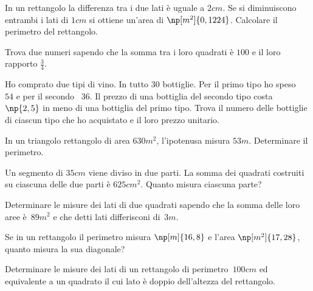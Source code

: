 \begin{multicols}{2}
\begin{esercizio}[\Ast]
 \label{ese:6.78}
In un rettangolo la differenza tra i due lati è uguale a $2\unit{cm}$. Se si diminuiscono entrambi i lati di $ 1\unit{cm} $ si ottiene un'area di $\np[m^2]{0,1224}$. Calcolare il perimetro del rettangolo.
\end{esercizio}

\begin{esercizio}[\Ast]
 \label{ese:6.79}
Trova due numeri sapendo che la somma tra i loro quadrati è $ 100 $ e il loro rapporto $ \frac 3 4 $.
\end{esercizio}

\begin{esercizio}[\Ast]
 \label{ese:6.80}
Ho comprato due tipi di vino. In tutto 30 bottiglie. Per il primo tipo ho speso \officialeuro~$54$ e per il secondo \officialeuro~$36$. Il prezzo di una bottiglia del secondo tipo costa \officialeuro~$\np{2,5}$ in meno di una bottiglia del primo tipo. Trova il numero delle bottiglie di ciascun tipo che ho acquistato e il loro prezzo unitario.
\end{esercizio}

\begin{esercizio}[\Ast]
 \label{ese:6.81}
In un triangolo rettangolo di area $630\unit{m^2}$, l'ipotenusa misura $53\unit{m}$. Determinare il perimetro.
\end{esercizio}

\begin{esercizio}[\Ast]
 \label{ese:6.82}
Un segmento di $35\unit{cm}$ viene diviso in due parti. La somma dei quadrati costruiti su ciascuna delle due parti è $625\unit{{cm}^2}$. Quanto misura ciascuna parte?
\end{esercizio}

\begin{esercizio}[\Ast]
 \label{ese:6.83}
Determinare le misure dei lati di due quadrati sapendo che la somma delle loro aree è~$89 \unit{m^{2}}$ e che detti lati differisconi di~$3 \unit{m}$.
\end{esercizio}

\begin{esercizio}[\Ast]
 \label{ese:6.84}
Se in un rettangolo il perimetro misura $\np[m]{16,8}$ e l'area $ \np[m^2]{17,28}$, quanto misura la sua diagonale?
\end{esercizio}

\begin{esercizio}[\Ast]
 \label{ese:6.85}
Determinare le misure dei lati di un rettangolo di perimetro~$100 \unit{cm}$ ed equivalente a un quadrato il cui lato è doppio  dell'altezza del rettangolo.
\end{esercizio}


\end{multicols}

